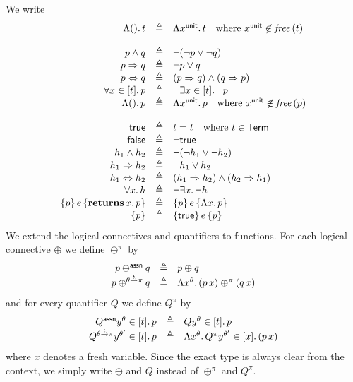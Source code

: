 \documentclass[12pt,a4paper]{report}
\newcommand{\returns}[2]{\ensuremath{\mathbf{returns}\,{#1}.\,{#2}}}
\begin{document}
We write
\[\begin{array}{rcl}
  \tabstr{\unit}{t}
  &\triangleq& \tabstr{x^\tunit}{t} \quad \text{where } x^{\tunit}\not\in\free{t} \\
  \\
  p \wedge q
  &\triangleq& \neg(\neg p \vee \neg q) \\
  p \Rightarrow q
  &\triangleq& \neg p \vee q \\
  p \Leftrightarrow q
  &\triangleq& (p \Rightarrow q) \wedge (q \Rightarrow p) \\
  \qball{x}{t}{p}
  &\triangleq& \neg\qbex{x}{t}{\neg p} \\
  \tabstr{\unit}{p}
  &\triangleq& \tabstr{x^\tunit}{p} \quad \text{where } x^{\tunit}\not\in\free{p} \\
  \\
  \true
  &\triangleq& t = t \quad \text{where } t \in \Term \\
  \false
  &\triangleq& \neg \true \\
  h_1 \wedge h_2
  &\triangleq& \neg(\neg h_1 \vee \neg h_2) \\
  h_1 \Rightarrow h_2
  &\triangleq& \neg h_1 \vee h_2 \\
  h_1 \Leftrightarrow h_2
  &\triangleq& (h_1 \Rightarrow h_2) \wedge (h_2 \Rightarrow h_1) \\
  \qall{x}{h}
  &\triangleq& \neg\qex{x}{\neg h} \\
  \triple{p}{e}{\returns{x}{p}}
  &\triangleq& \triple{p}{e}{\tabstr{x}{p}} \\
  \{p\}
  &\triangleq& \triple{\true}{e}{p}
\end{array}\]
We extend the logical connectives and quantifiers to functions. For each
logical connective $\oplus$ we define $\oplus^\pi$ by
\[\begin{array}{rcl}
  p \oplus^{\mathsf{assn}} q
  &\triangleq& p \oplus q \\
  p \oplus^{\theta\stackrel{_t}{\to}\pi} q
  &\triangleq& \Lambda x^\theta.\,(p\,x) \oplus^\pi (q\,x)
\end{array}\]
and for every quantifier $Q$ we define $Q^\pi$ by
\[\begin{array}{rcl}
  Q^{\mathsf{assn}} y^\theta\in[t].\,p
  &\triangleq& Q y^\theta\in[t].\,p \\
  Q^{\theta\stackrel{_t}{\to}\pi} y^{\theta'}\in[t].\,p
  &\triangleq& \Lambda x^\theta.\,Q^\pi y^{\theta'}\in[x].\,(p\,x)
\end{array}\]
where $x$ denotes a fresh variable. Since the exact type is always clear from
the context, we simply write $\oplus$ and $Q$ instead of $\oplus^\pi$ and
$Q^\pi$.
\end{document}
